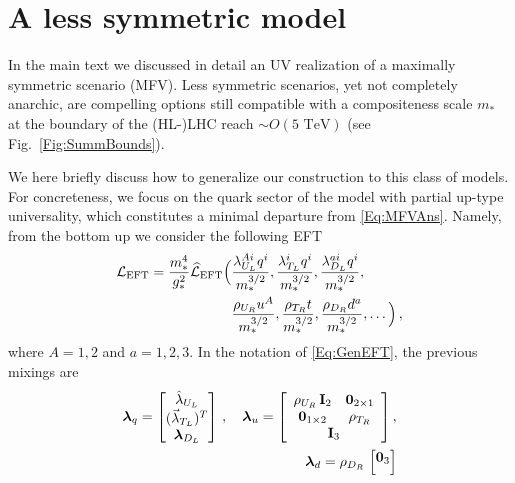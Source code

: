 \documentclass[aps,prl,twocolumn,showpacs,10pt,preprintnumbers,nofootinbib]{revtex4-2}
\newcommand{\TeV}{\,\mathrm{TeV}}
\newcommand{\mst}{m_*}
\begin{document}
{\section{A less symmetric model}\label{App:LessSModel}
In the main text we discussed in detail an UV realization of a maximally symmetric scenario (MFV). Less symmetric scenarios, yet not completely anarchic, are compelling options still compatible with a compositeness scale $\mst$ at the boundary of the (HL-)LHC reach $\sim O(5\,\TeV)$ \cite{Glioti:2024hye}(see Fig.~\ref{Fig:SummBounds}). 

We here briefly discuss how to generalize our construction to this class of models. For concreteness, we focus on the quark sector of the model with partial up-type universality, which constitutes a minimal departure from \eqref{Eq:MFVAns}. Namely, from the bottom up we consider the following EFT
\begin{align}\label{Eq:NMFVAns}
\begin{aligned}
    {\cal L}_{\rm EFT}=\frac{m_*^4}{g_*^2}\widehat{\cal L}_{\rm EFT}\Big(&\frac{\lambda^{Ai}_{U_L} q^i}{m_*^{3/2}},\frac{\lambda^{i}_{T_L} q^i}{m_*^{3/2}},\frac{\lambda^{ai}_{D_L} q^i}{m_*^{3/2}},\\
    &\frac{\rho_{U_R} u^A}{m_*^{3/2}},\frac{\rho_{T_R} t}{m_*^{3/2}},\frac{\rho_{D_R} d^a}{m_*^{3/2}},\ldots \Big)\,,
\end{aligned}
\end{align}
where $A=1,2$ and $a=1,2,3$. In the notation of \eqref{Eq:GenEFT}, the previous mixings are
\begin{align}\label{Eq:NMFVAnsStruct}
\begin{aligned}
\boldsymbol{\lambda}_{q} = 
\begin{bmatrix}
    \hat{\lambda}_{U_L}\\
    (\vec{\lambda}_{T_L})^T\\
    \boldsymbol\lambda_{D_L}
\end{bmatrix}
\, , \quad
\boldsymbol\lambda_{u} =
\left[
 \begin{array}{cc}
    \rho_{U_R} \, \mathbf{I}_2 & \mathbf{0}_{2 \times 1} \\ 
    \mathbf{0}_{1 \times 2} & \rho_{T_R} \\ 
    \multicolumn{2}{c}{\mathbf{I}_3}
  \end{array}
\right] ,\\
\quad 
\boldsymbol\lambda_{d} = 
\rho_{D_R}\,
\begin{bmatrix}
    \mathbf{0}_3 \\[6pt]

\end{bmatrix}
\end{aligned}
\end{align}}
\end{document}

